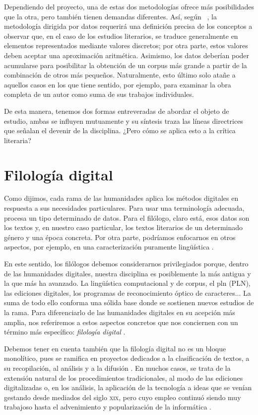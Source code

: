 Dependiendo del proyecto, una de estas dos metodologías ofrece más posibilidades que la otra, pero también tienen demandas diferentes. Así, según \citeauthor{escobar2021}~\parencite*[12]{escobar2021}, la metodología dirigida por datos requerirá una definición precisa de los conceptos a observar que, en el caso de los estudios literarios, se traduce generalmente en elementos representados mediante valores discretos; por otra parte, estos valores deben aceptar una aproximación aritmética. Asimismo, los datos deberían poder acumularse para posibilitar la obtención de un corpus más grande a partir de la combinación de otros más pequeños. Naturalmente, esto último solo atañe a aquellos casos en los que tiene sentido, por ejemplo, para examinar la obra completa de un autor como suma de sus trabajos individuales.

De esta manera, tenemos dos formas entreveradas de abordar el objeto de estudio, ambas se influyen mutuamente y su síntesis traza las líneas directrices que señalan el devenir de la disciplina. ¿Pero cómo se aplica esto a la crítica literaria?

\section{Filología digital}
Como dijimos, cada rama de las humanidades aplica los métodos digitales en respuesta a sus necesidades particulares. Para usar una terminología adecuada, procesa un tipo determinado de datos. Para el filólogo, claro está, esos datos son los textos y, en nuestro caso particular, los textos literarios de un determinado género y una época concreta. Por otra parte, podríamos enfocarnos en otros aspectos, por ejemplo, en una caracterización puramente lingüística \parencite{sanz2021c}.

 En este sentido, los filólogos debemos considerarnos privilegiados porque, dentro de las humanidades digitales, nuestra disciplina es posiblemente la más antigua y la que más ha avanzado. La lingüística computacional y de corpus, el \acl{pln} (PLN), las ediciones digitales, los programas de reconocimiento óptico de caracteres... La suma de todo ello conforma una sólida base donde se sostienen nuevos estudios de la rama. Para diferenciarlo de las humanidades digitales en su acepción más amplia, nos referiremos a estos aspectos concretos que nos conciernen con un término más específico: \textit{filología digital} \parencite{andrews2013}.

Debemos tener en cuenta también que la filología digital no es un bloque monolítico, pues se ramifica en proyectos dedicados a la clasificación de textos,  a su recopilación, al análisis y a la difusión \parencite{baycheng2017}. En muchos casos, se trata de la extensión natural de los procedimientos tradicionales, al modo de las ediciones digitalizadas o, en los análisis, la aplicación de la tecnología a ideas que se venían gestando desde mediados del siglo \textsc{xix}, pero cuyo empleo continuó siendo muy trabajoso hasta el advenimiento y popularización de la informática \parencite[517]{hoover2013}.

